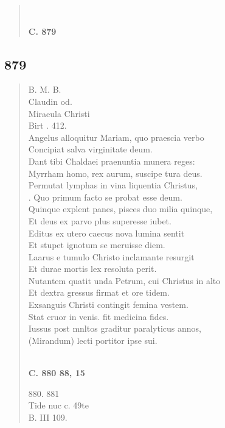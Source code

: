 \documentclass[11pt, a4paper]{report}
\begin{document}
\begin{verse}
        ﻿\pagebreak 
     \marginpar{[329]} \begin{center} \textbf{C. 879} \end{center}
      \end{verse}
  
            \subsection*{879}
      \begin{verse}
      B. M. B. \\ Claudin od. \\ Miraeula Christi \\ Birt . 412. \\ Angelus alloquitur Mariam, quo praescia verbo \\ Concipiat salva virginitate deum. \\ Dant tibi Chaldaei praenuntia munera reges: \\ Myrrham homo, rex aurum, suscipe tura deus. \\ Permutat lymphas in vina liquentia Christus, \\ . Quo primum facto se probat esse deum. \\ Quinque explent panes, pisces duo milia quinque, \\ Et deus ex parvo plus superesse iubet. \\ Editus ex utero caecus nova lumina sentit \\ Et stupet ignotum se meruisse diem. \\ Laarus e tumulo Christo inclamante resurgit \\ Et durae mortis lex resoluta perit. \\ Nutantem quatit unda Petrum, cui Christus in alto \\ Et dextra gressus firmat et ore tidem. \\ Exsanguis Christi contingit femina vestem. \\ Stat cruor in venis. fit medicina fides. \\ Iussus post mnltos graditur paralyticus annos, \\ (Mirandum) lecti portitor ipse sui. \\ 
        ﻿\pagebreak 
    \begin{center} \textbf{C. 880 88, 15} \end{center} \marginpar{[330]} 880. 881 \\ Tide nuc c. 49te \\ B. III 109. \\ 
      \end{verse}
  
\end{document}
